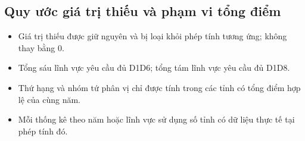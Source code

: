 \subsection{Quy ước giá trị thiếu và phạm vi tổng điểm}

\begin{itemize}
    \setlength{\itemsep}{0.2em}
    \setlength{\parskip}{0pt}
    \item Giá trị thiếu được giữ nguyên và bị loại khỏi phép tính tương ứng; không thay bằng 0.
    \item Tổng sáu lĩnh vực yêu cầu đủ D1\textendash D6; tổng tám lĩnh vực yêu cầu đủ D1\textendash D8.
    \item Thứ hạng và nhóm tứ phân vị chỉ được tính trong các tỉnh có tổng điểm hợp lệ của cùng năm.
    \item Mỗi thống kê theo năm hoặc lĩnh vực sử dụng số tỉnh có dữ liệu thực tế tại phép tính đó.
\end{itemize}

